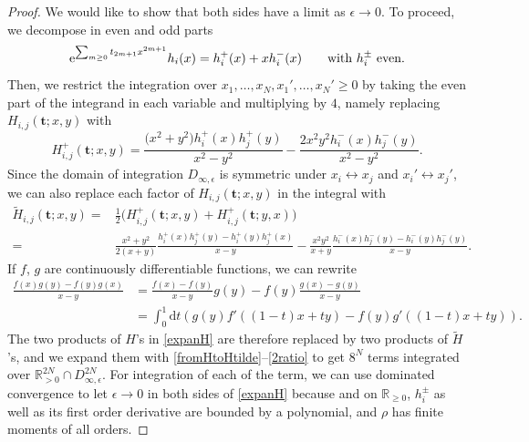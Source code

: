 \documentclass[10pt,a4paper]{amsart}
\numberwithin{equation}{section}
\newcommand{\dd}{\mathrm{d}}
\begin{document}
\begin{proof}
We would like to show that both sides have a limit as $\epsilon \rightarrow 0$. To proceed, we decompose in even and odd parts
\[
{\rm e}^{\sum_{m \geq 0} t_{2m + 1}x^{2m + 1}} h_i(x) = h_i^+(x) + xh_i^-(x) \qquad \text{with}\ h_i^{\pm} \ \text{even}.
\]
Then, we restrict the integration over $x_1,\dots,x_N ,x_1',\dots,x_N'\geq 0$ by taking the even part of the integrand in each variable and multiplying by $4$, namely replacing $H_{i,j}(\mathbf{t};x,y)$ with
\[
H_{i,j}^+(\mathbf{t};x,y) = \frac{\bigl(x^2+y^2\bigr)h_i^+(x)h_j^+(y)}{x^2 - y^2} - \frac{2x^2y^2h_i^-(x)h_j^-(y)}{x^2 - y^2}.
\]
Since the domain of integration $D_{\infty,\epsilon}$ is symmetric under $x_i \leftrightarrow x_j$ and $x_i' \leftrightarrow x_j'$, we can also replace each factor of $H_{i,j}(\mathbf{t};x,y)$ in the integral with
\begin{align}
\tilde{H}_{i,j}(\mathbf{t};x,y) ={}& \frac{1}{2}\bigl(H_{i,j}^+(\mathbf{t};x,y) + H_{i,j}^+(\mathbf{t};y,x)\bigr) \label{fromHtoHtilde}\\
={}& \frac{x^2 + y^2}{2(x+y)} \frac{h_i^+(x)h_j^+(y) - h_i^+(y)h_j^+(x)}{x - y} - \frac{x^2y^2}{x+y} \frac{h_i^-(x)h_j^-(y) - h_i^-(y)h_j^-(y)}{x - y}.
\nonumber
\end{align}
If $f$, $g$ are continuously differentiable functions, we can rewrite
\begin{align}
\frac{f(x)g(y) - f(y)g(x)}{x - y} & = \frac{f(x) - f(y)}{x - y} g(y) - f(y) \frac{g(x) - g(y)}{x - y} \nonumber\\
& = \int_{0}^{1}\dd t (g(y)f'((1-t)x + ty) - f(y)g'((1-t)x + ty)).\label{2ratio}
\end{align}
The two products of $H$'s in \eqref{expanH} are therefore replaced by
two products of $\tilde{H}$'s, and we expand them with
\eqref{fromHtoHtilde}--\eqref{2ratio} to get $8^N$ terms integrated
over $\mathbb{R}_{> 0}^{2N} \cap D_{\infty,\epsilon}^{2N}$. For
integration of each of the term, we can use dominated convergence to
let $\epsilon \rightarrow 0$ in both sides of \eqref{expanH} because
 and  on
$\mathbb{R}_{\geq 0}$, $h_i^{\pm}$ as well as its first order derivative are
bounded by a polynomial, and $\rho$ has finite moments of all orders.


\end{proof}
\end{document}

